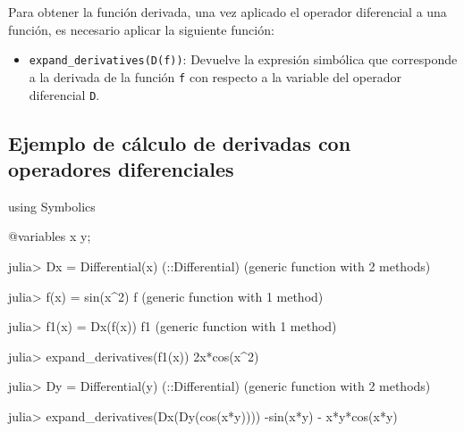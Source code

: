 \documentclass[
  letterpaper,
  DIV=11,
  numbers=noendperiod]{scrreprt}
\newenvironment{Shaded}{\begin{snugshade}}{\end{snugshade}}
\newcommand{\BuiltInTok}[1]{\textcolor[rgb]{0.00,0.23,0.31}{#1}}
\newcommand{\DataTypeTok}[1]{\textcolor[rgb]{0.68,0.00,0.00}{#1}}
\newcommand{\FloatTok}[1]{\textcolor[rgb]{0.68,0.00,0.00}{#1}}
\newcommand{\FunctionTok}[1]{\textcolor[rgb]{0.28,0.35,0.67}{#1}}
\newcommand{\ImportTok}[1]{\textcolor[rgb]{0.00,0.46,0.62}{#1}}
\newcommand{\KeywordTok}[1]{\textcolor[rgb]{0.00,0.23,0.31}{#1}}
\newcommand{\NormalTok}[1]{\textcolor[rgb]{0.00,0.23,0.31}{#1}}
\newcommand{\OperatorTok}[1]{\textcolor[rgb]{0.37,0.37,0.37}{#1}}
\newcommand{\PreprocessorTok}[1]{\textcolor[rgb]{0.68,0.00,0.00}{#1}}
\providecommand{\tightlist}{%
  \setlength{\itemsep}{0pt}\setlength{\parskip}{0pt}}\usepackage{longtable,booktabs,array}
\begin{document}
Para obtener la función derivada, una vez aplicado el operador
diferencial a una función, es necesario aplicar la siguiente función:

\begin{itemize}
\tightlist
\item
  \texttt{expand\_derivatives(D(f))}: Devuelve la expresión simbólica
  que corresponde a la derivada de la función \texttt{f} con respecto a
  la variable del operador diferencial \texttt{D}.
\end{itemize}

\hypertarget{ejemplo-de-cuxe1lculo-de-derivadas-con-operadores-diferenciales}{%
\subsection{Ejemplo de cálculo de derivadas con operadores
diferenciales}\label{ejemplo-de-cuxe1lculo-de-derivadas-con-operadores-diferenciales}}

\begin{Shaded}
\begin{Highlighting}[]
\ImportTok{using} \BuiltInTok{Symbolics}

\PreprocessorTok{@variables}\NormalTok{ x y;}

\NormalTok{julia}\OperatorTok{\textgreater{}}\NormalTok{ Dx }\OperatorTok{=} \FunctionTok{Differential}\NormalTok{(x)}
\NormalTok{(}\OperatorTok{::}\DataTypeTok{Differential}\NormalTok{) (generic }\KeywordTok{function}\NormalTok{ with }\FloatTok{2}\NormalTok{ methods)}

\NormalTok{julia}\OperatorTok{\textgreater{}} \FunctionTok{f}\NormalTok{(x) }\OperatorTok{=} \FunctionTok{sin}\NormalTok{(x}\OperatorTok{\^{}}\FloatTok{2}\NormalTok{)}
\NormalTok{f (generic }\KeywordTok{function}\NormalTok{ with }\FloatTok{1}\NormalTok{ method)}

\NormalTok{julia}\OperatorTok{\textgreater{}} \FunctionTok{f1}\NormalTok{(x) }\OperatorTok{=} \FunctionTok{Dx}\NormalTok{(}\FunctionTok{f}\NormalTok{(x))}
\NormalTok{f1 (generic }\KeywordTok{function}\NormalTok{ with }\FloatTok{1}\NormalTok{ method)}

\NormalTok{julia}\OperatorTok{\textgreater{}} \FunctionTok{expand\_derivatives}\NormalTok{(}\FunctionTok{f1}\NormalTok{(x))}
\FloatTok{2}\FunctionTok{x*cos}\NormalTok{(x}\OperatorTok{\^{}}\FloatTok{2}\NormalTok{)}

\NormalTok{julia}\OperatorTok{\textgreater{}}\NormalTok{ Dy }\OperatorTok{=} \FunctionTok{Differential}\NormalTok{(y)}
\NormalTok{(}\OperatorTok{::}\DataTypeTok{Differential}\NormalTok{) (generic }\KeywordTok{function}\NormalTok{ with }\FloatTok{2}\NormalTok{ methods)}

\NormalTok{julia}\OperatorTok{\textgreater{}} \FunctionTok{expand\_derivatives}\NormalTok{(}\FunctionTok{Dx}\NormalTok{(}\FunctionTok{Dy}\NormalTok{(}\FunctionTok{cos}\NormalTok{(x}\OperatorTok{*}\NormalTok{y))))}
\FunctionTok{{-}sin}\NormalTok{(x}\OperatorTok{*}\NormalTok{y) }\OperatorTok{{-}} \FunctionTok{x*y*cos}\NormalTok{(x}\OperatorTok{*}\NormalTok{y)}
\end{Highlighting}
\end{Shaded}
\end{document}
